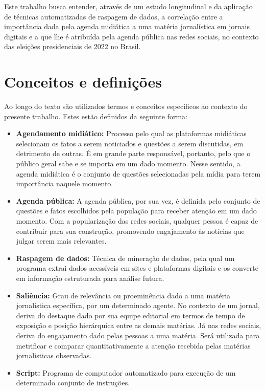 \documentclass[
	12pt,
	oneside,
	a4paper,
	english,
	brazil
]{abntex2ppgsi}
\begin{document}
Este trabalho busca entender, através de um estudo longitudinal e da aplicação de técnicas automatizadas de raspagem de dados, a correlação entre a importância dada pela agenda midiática a uma matéria jornalística em jornais digitais e a que lhe é atribuída pela agenda pública nas redes sociais, no contexto das eleições presidenciais de 2022 no Brasil.

\section{Conceitos e definições}
Ao longo do texto são utilizados termos e conceitos específicos ao contexto do presente trabalho. Estes estão definidos da seguinte forma:
\begin{itemize}
    \item \textbf{Agendamento midiático:} Processo pelo qual as plataformas midiáticas selecionam os fatos a serem noticiados e questões a serem discutidas, em detrimento de outras. É em grande parte responsável, portanto, pelo que o público geral sabe e se importa em um dado momento. Nesse sentido, a agenda midiática é o conjunto de questões selecionadas pela mídia para terem importância naquele momento.
    \item \textbf{Agenda pública:} A agenda pública, por sua vez, é definida pelo conjunto de questões e fatos escolhidos pela população para receber atenção em um dado momento. Com a popularização das redes sociais, qualquer pessoa é capaz de contribuir para sua construção, promovendo engajamento às notícias que julgar serem mais relevantes.
    \item \textbf{Raspagem de dados:} Técnica de mineração de dados, pela qual um programa extrai dados acessíveis em sites e plataformas digitais e os converte em informação estruturada para análise futura.
    \item \textbf{Saliência:} Grau de relevância ou proeminência dado a uma matéria jornalística específica, por um determinado agente. No contexto de um jornal, deriva do destaque dado por sua equipe editorial em termos de tempo de exposição e posição hierárquica entre as demais matérias. Já nas redes sociais, deriva do engajamento dado pelas pessoas a uma matéria. Será utilizada para metrificar e comparar quantitativamente a atenção recebida pelas matérias jornalísticas observadas.
    \item \textbf{Script:} Programa de computador automatizado para execução de um determinado conjunto de instruções.
\end{itemize}
\end{document}
